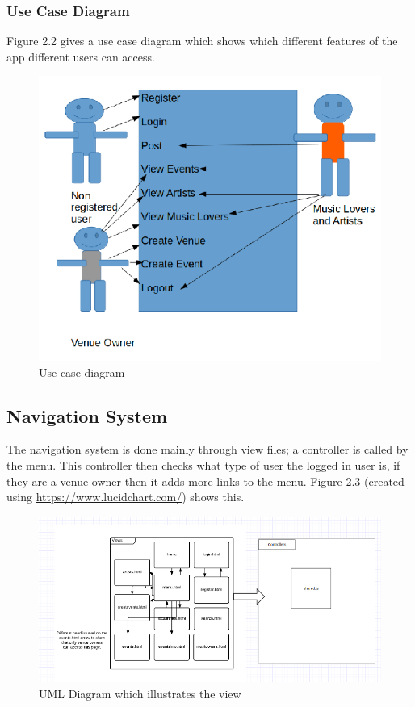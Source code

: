 \subsubsection{Use Case Diagram}
Figure 2.2 gives a use case diagram which shows which different features of the app different users can access.

\begin{figure}[H]
\includegraphics[width=\textwidth,height=\textheight,keepaspectratio]{images/usecase}
\caption{Use case diagram}
\end{figure}



\subsection{Navigation System}
The navigation system is done mainly through view files; a controller is called by the menu. This controller then checks what type of user the logged in user is, if they are a venue owner then it adds more links to the menu. Figure 2.3 (created using \url{https://www.lucidchart.com/}) shows this.

\begin{figure}[H]
\includegraphics[width=\textwidth,height=\textheight,keepaspectratio]{images/systemdesign}
\caption{UML Diagram which illustrates the view}
\end{figure}


